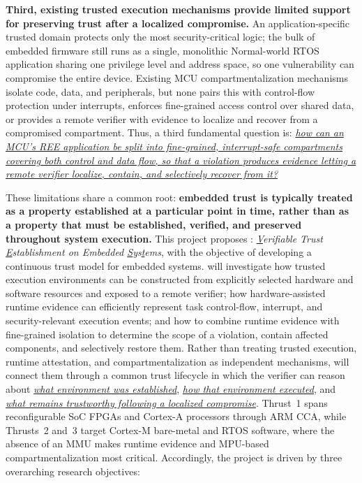 \textbf{Third, existing trusted execution mechanisms provide limited support for preserving trust after a localized compromise.}
An application-specific trusted domain protects only the most security-critical logic; the bulk of embedded firmware still runs as a single, monolithic Normal-world RTOS application sharing one privilege level and address space, so one vulnerability can compromise the entire device.
Existing MCU compartmentalization mechanisms~\cite{clements2018aces,kim2018securing,khan2023ec,mera2022d} isolate code, data, and peripherals, but none pairs this with control-flow protection under interrupts, enforces fine-grained access control over shared data, or provides a remote verifier with evidence to localize and recover from a compromised compartment.
Thus, a third fundamental question is: \emph{\ul{how can an MCU's REE application be split into fine-grained, interrupt-safe compartments covering both control and data flow, so that a violation produces evidence letting a remote verifier localize, contain, and selectively recover from it?}}

These limitations share a common root: \textbf{embedded trust is typically treated as a property established at a particular point in time, rather than as a property that must be established, verified, and preserved throughout system execution.}
This project proposes \sys: \textit{\underline{V}erifiable Trust \underline{E}stablishment on Embedded \underline{S}ys\underline{t}ems}, with the objective of developing a continuous trust model for embedded systems.
\sys will investigate how trusted execution environments can be constructed from explicitly selected hardware and software resources and exposed to a remote verifier; how hardware-assisted runtime evidence can efficiently represent task control-flow, interrupt, and security-relevant execution events; and how to combine runtime evidence with fine-grained isolation to determine the scope of a violation, contain affected components, and selectively restore them.
Rather than treating trusted execution, runtime attestation, and compartmentalization as independent mechanisms, \sys will connect them through a common trust lifecycle in which the verifier can reason about \emph{\ul{what environment was established}}, \emph{\ul{how that environment executed}}, and \emph{\ul{what remains trustworthy following a localized compromise}}.
Thrust~1 spans reconfigurable SoC FPGAs and Cortex-A processors through ARM CCA, while Thrusts~2 and~3 target Cortex-M bare-metal and RTOS software, where the absence of an MMU makes runtime evidence and MPU-based compartmentalization most critical.
Accordingly, the project is driven by three overarching research objectives:

